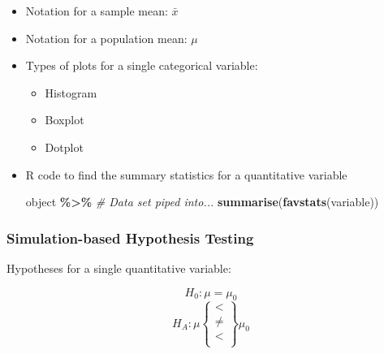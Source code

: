 \documentclass[
]{report}
\newenvironment{Shaded}{\begin{snugshade}}{\end{snugshade}}
\newcommand{\CommentTok}[1]{\textcolor[rgb]{0.56,0.35,0.01}{\textit{#1}}}
\newcommand{\FunctionTok}[1]{\textcolor[rgb]{0.13,0.29,0.53}{\textbf{#1}}}
\newcommand{\NormalTok}[1]{#1}
\newcommand{\SpecialCharTok}[1]{\textcolor[rgb]{0.81,0.36,0.00}{\textbf{#1}}}
\begin{document}
\begin{itemize}
\item
  Notation for a sample mean: \(\bar{x}\)
\item
  Notation for a population mean: \(\mu\)
\item
  Types of plots for a single categorical variable:

  \begin{itemize}
  \item
    Histogram
  \item
    Boxplot
  \item
    Dotplot
  \end{itemize}
\item
  R code to find the summary statistics for a quantitative variable

\begin{Shaded}
\begin{Highlighting}[]
\NormalTok{object }\SpecialCharTok{\%\textgreater{}\%} \CommentTok{\# Data set piped into...}
    \FunctionTok{summarise}\NormalTok{(}\FunctionTok{favstats}\NormalTok{(variable))}
\end{Highlighting}
\end{Shaded}
\end{itemize}

\subsubsection*{Simulation-based Hypothesis Testing}\label{simulation-based-hypothesis-testing}

Hypotheses for a single quantitative variable:

\[H_0: \mu = \mu_0\]
\[H_A: \mu\left\{
\begin{array}{ll}
< \\
\ne \\
< \\
\end{array}
\right\}
\mu_0 \]
\end{document}
